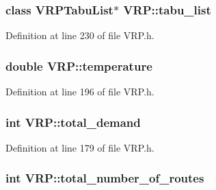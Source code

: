\hypertarget{class_v_r_p_ae2febf169fbb970db5d3e4b1afdfdf2b}{
\subsubsection[{tabu\_\-list}]{\setlength{\rightskip}{0pt plus 5cm}class {\bf VRPTabuList}$\ast$ {\bf VRP::tabu\_\-list}}}
\label{class_v_r_p_ae2febf169fbb970db5d3e4b1afdfdf2b}


Definition at line 230 of file VRP.h.

\hypertarget{class_v_r_p_a328026fe60722fe6cc09a4c5aae404b8}{
\subsubsection[{temperature}]{\setlength{\rightskip}{0pt plus 5cm}double {\bf VRP::temperature}}}
\label{class_v_r_p_a328026fe60722fe6cc09a4c5aae404b8}


Definition at line 196 of file VRP.h.

\hypertarget{class_v_r_p_a65f10da2ba558e09769475bdcbb107de}{
\subsubsection[{total\_\-demand}]{\setlength{\rightskip}{0pt plus 5cm}int {\bf VRP::total\_\-demand}}}
\label{class_v_r_p_a65f10da2ba558e09769475bdcbb107de}


Definition at line 179 of file VRP.h.

\hypertarget{class_v_r_p_aaf80fa84fe5d2641ecbd125b237a69fe}{
\subsubsection[{total\_\-number\_\-of\_\-routes}]{\setlength{\rightskip}{0pt plus 5cm}int {\bf VRP::total\_\-number\_\-of\_\-routes}}}
\label{class_v_r_p_aaf80fa84fe5d2641ecbd125b237a69fe}



